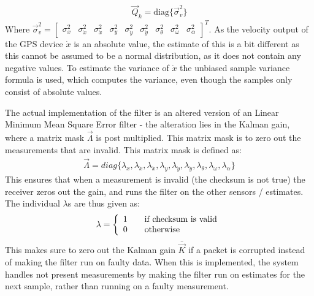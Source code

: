 \documentclass{ifacconf}
\begin{document}
\begin{align}
\vec{Q}_k = \text{diag}\{\vec{\sigma}^2_{v}\}
\end{align}
Where $\vec{\sigma}^2_{v} = \begin{bmatrix}\sigma^2_x & \sigma^2_{\dot{x}} & \sigma^2_{{\ddot{x}}} & \sigma^2_y & \sigma^2_{\dot{y}} & \sigma^2_{{\ddot{y}}} & \sigma^2_\theta & \sigma^2_\omega & \sigma^2_\alpha \end{bmatrix}^T$. As the velocity output of the GPS device $\dot{x}$ is an absolute value, the estimate of this is a bit different as this cannot be assumed to be a normal distribution, as it does not contain any negative values. To estimate the variance of $\dot{x}$ the unbiased sample variance formula is used, which computes the variance, even though the samples only consist of absolute values. 

The actual implementation of the filter is an altered version of an Linear Minimum Mean Square Error filter - the alteration lies in the Kalman gain, where a matrix mask $\vec{\Lambda}$ is post multiplied. This matrix mask is to zero out the measurements that are invalid. This matrix mask is defined as:
\begin{align}
\vec{\Lambda} = diag\{ \lambda_x,\lambda_{\dot{x}},\lambda_{\ddot{x}},\lambda_y,\lambda_{\dot{y}},\lambda_{\ddot{y}},\lambda_{\theta},\lambda_{\omega},\lambda_{\alpha} \}
\end{align}
This ensures that when a measurement is invalid (the checksum is not true) the receiver zeros out the gain, and runs the filter on the other sensors / estimates. The individual $\lambda$s are thus given as:
\begin{align}
\lambda = 
\left\{
  \begin{array}{l l}
    1 & \quad \text{if checksum is valid}\\
    0 & \quad \text{otherwise}
  \end{array} \right.
\end{align} 
This makes sure to zero out the Kalman gain $\bar{\vec{K}}$ if a packet is corrupted instead of making the filter run on faulty data. When this is implemented, the system handles not present measurements by making the filter run on estimates for the next sample, rather than running on a faulty measurement.
\end{document}
